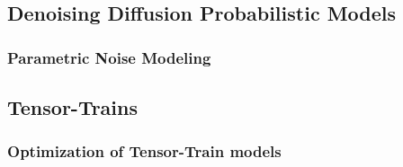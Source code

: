 \documentclass[11pt]{article}
\begin{document}
    \subsection{Denoising Diffusion Probabilistic Models}\label{subsec:denoising-diffusion-probabilistic-models}

    \subsubsection{Parametric Noise Modeling}\label{subsubsec:parametric-noise-modeling}
    
    \subsection{Tensor-Trains}\label{subsec:tensor-trains}
    \subsubsection{Optimization of Tensor-Train models}\label{subsubsec:tensor-train-models-opt}
\end{document}
